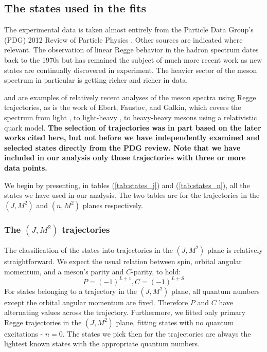 \documentclass[11pt,a4]{article}
\def\be{\begin{equation}}
\def\ee{\end{equation}}
\begin{document}
\subsection{The states used in the fits}
The experimental data is taken almost entirely from the Particle Data Group's (PDG) 2012 Review of Particle Physics \cite{PDG:2012}. Other sources are indicated where relevant. The observation of linear Regge behavior in the hadron spectrum dates back to the 1970s \cite{Collins:book} but has remained the subject of much more recent work as new states are continually discovered in experiment. The heavier sector of the meson spectrum in particular is getting richer and richer in data\cite{Eichten:2007qx}\cite{Brambilla:2010cs}.
	
\cite{Anisovich:2000kxa} and \cite{Gershtein:2006ng} are examples of relatively recent analyses of the meson spectra using Regge trajectories, as is the work of Ebert, Faustov, and Galkin, which covers the spectrum from light \cite{Ebert:2009ub}, to light-heavy \cite{Ebert:2009ua}, to heavy-heavy mesons \cite{Ebert:2011jc} using a relativistic quark model. \textbf{The selection of trajectories was in part based on the later works cited here, but not before we have independently examined and selected states directly from the PDG review. Note that we have included in our analysis only those trajectories with three or more data points.}

We begin by presenting, in tables (\ref{tab:states_j}) and (\ref{tab:states_n}), all the states we have used in our analysis. The two tables are for the trajectories in the \((J,M^2)\) and \((n,M^2)\) planes respectively.

\subsubsection{The \texorpdfstring{$(J,M^2)$}{(J,M2)} trajectories}
The classification of the states into trajectories in the \((J,M^2)\) plane is relatively straightforward. We expect the usual relation between spin, orbital angular momentum, and a meson's parity and \(C\)-parity, to hold:
\be P = (-1)^{L+1}, C = (-1)^{L+S} \ee
For states belonging to a trajectory in the \((J,M^2)\) plane, all quantum numbers except the orbital angular momentum are fixed. Therefore \(P\) and \(C\) have alternating values across the trajectory. Furthermore, we fitted only primary Regge trajectories in the \((J,M^2)\) plane, fitting states with no quantum excitations - \(n = 0\). The states we pick then for the trajectories are always the lightest known states with the appropriate quantum numbers.
\end{document}
